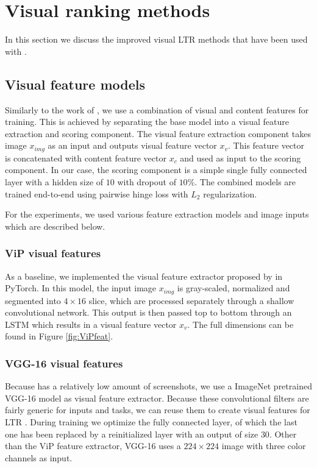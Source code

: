 \section{Visual ranking methods}
In this section we discuss the improved visual \ac{LTR} methods that have been used with \datasetname.

\subsection{Visual feature models}
Similarly to the work of \citet{fan2017learning}, we use a combination of visual and content features for training. This is achieved by separating the base model into a visual feature extraction and scoring component. The visual feature extraction component takes image $x_{img}$ as an input and outputs visual feature vector $x_{v}$. This feature vector is concatenated with content feature vector $x_{c}$ and used as input to the scoring component. In our case, the scoring component is a simple single fully connected layer with a hidden size of $10$ with dropout of $10\%$. The combined models are trained end-to-end using pairwise hinge loss with $L_2$ regularization. 

For the experiments, we used various feature extraction models and image inputs which are described below.

\subsubsection{ViP visual features}
As a baseline, we implemented the visual feature extractor proposed by \citet{fan2017learning} in PyTorch. In this model, the input image $x_{img}$ is gray-scaled, normalized and segmented into $4\times16$ slice, which are processed separately through a shallow convolutional network. This output is then passed top to bottom through an LSTM which results in a visual feature vector $x_{v}$. The full dimensions can be found in Figure \ref{fig:ViPfeat}.

\subsubsection{VGG-16 visual features}
Because \datasetname has a relatively low amount of screenshots, we use a ImageNet pretrained VGG-16 \cite{simonyan2014very} model as visual feature extractor. Because these convolutional filters are fairly generic for inputs and tasks, we can reuse them to create visual features for LTR . During training we optimize the fully connected layer, of which the last one has been replaced by a reinitialized layer with an output of size $30$.  Other than the ViP feature extractor, VGG-16 uses a $224\times224$ image with three color channels as input. 

